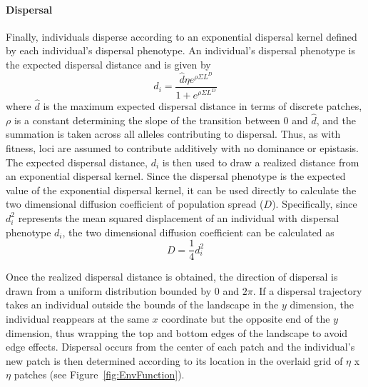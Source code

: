 \documentclass[12pt, oneside]{article}
\begin{document}
\paragraph{Dispersal}
Finally, individuals disperse according to an exponential dispersal kernel defined by each individual's dispersal phenotype. An individual's dispersal phenotype is the expected dispersal distance and is given by
\begin{equation}
d_{i} = \frac{\hat{d}\eta e^{\rho\Sigma L^{D}}}{1+e^{\rho\Sigma L^{D}}} 
\end{equation}
where $\hat{d}$ is the maximum expected dispersal distance in terms of discrete patches, $\rho$ is a constant determining the slope of the transition between $0$ and $\hat{d}$, and the summation is taken across all alleles contributing to dispersal. Thus, as with fitness, loci are assumed to contribute additively with no dominance or epistasis. The expected dispersal distance, $d_{i}$ is then used to draw a realized distance from an exponential dispersal kernel. Since the dispersal phenotype is the expected value of the exponential dispersal kernel, it can be used directly to calculate the two dimensional diffusion coefficient of population spread ($D$). Specifically, since $d_{i}^{2}$ represents the mean squared displacement of an individual with dispersal phenotype $d_{i}$, the two dimensional diffusion coefficient can be calculated as
\begin{equation}
D = \frac{1}{4}d_{i}^{2}
\end{equation}

Once the realized dispersal distance is obtained, the direction of dispersal is drawn from a uniform distribution bounded by $0$ and $2\pi$. If a dispersal trajectory takes an individual outside the bounds of the landscape in the $y$ dimension, the individual reappears at the same $x$ coordinate but the opposite end of the $y$ dimension, thus wrapping the top and bottom edges of the landscape to avoid edge effects. Dispersal occurs from the center of each patch and the individual's new patch is then determined according to its location in the overlaid grid of $\eta$ x $\eta$ patches (see Figure~\ref{fig:EnvFunction}).



\end{document}
